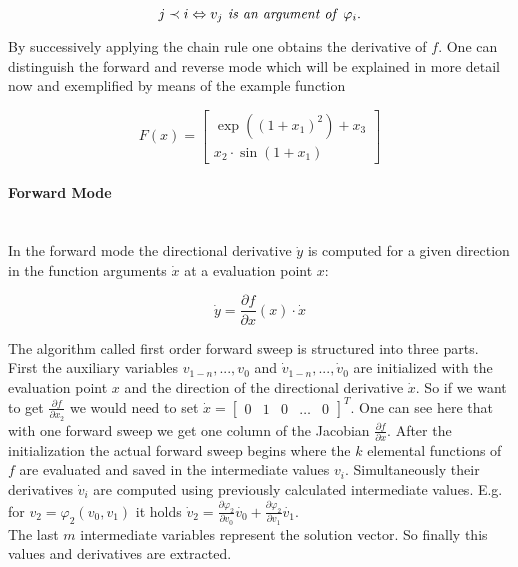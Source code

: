 \documentclass{scrartcl}[12pt, halfparskip]
\begin{document}
\begin{equation}
j \prec i \Leftrightarrow v_j \text{\textit{ is an argument of }} \varphi_i.
\end{equation}

By successively applying the chain rule one obtains the derivative of $f$.
One can distinguish the forward and reverse mode which will be explained in more detail now and exemplified by means of the example function

\begin{equation}
F(x) = 
\begin{bmatrix}
\exp((1+x_1)^2) + x_3 \\
x_2 \cdot \sin(1+x_1)
\end{bmatrix}
\end{equation}


\paragraph{Forward Mode}\mbox{}\\
In the forward mode the directional derivative $\dot{y}$ is computed for a given direction in the function arguments $\dot{x}$ at a evaluation point $x$:

\begin{equation}
\dot{y} = \frac{\partial f}{\partial x}(x) \cdot \dot{x}
\label{eq:AD_example}
\end{equation}

The algorithm called first order forward sweep is structured into three parts. First the auxiliary variables $v_{1-n},...,v_0$ and $\dot{v}_{1-n},...,\dot{v}_0$ are initialized with the evaluation point $x$ and the direction of the directional derivative $\dot{x}$. So if we want to get $\frac{\partial f}{\partial x_2}$ we would need to set $\dot{x} = \begin{bmatrix}
0 & 1 & 0 & \dots & 0
\end{bmatrix}^T$. One can see here that with one forward sweep we get one column of the Jacobian $ \frac{\partial f}{\partial x}$. 
After the initialization the actual forward sweep begins where the $k$ elemental functions of $f$ are evaluated and saved in the intermediate values $v_i$. Simultaneously their derivatives  $\dot{v}_i$ are computed using previously calculated intermediate values. E.g. for $v_2 = \varphi_2(v_0, v_1)$ it holds $\dot{v}_2 = \frac{\partial \varphi_2}{\partial v_0} \dot{v_0} + \frac{\partial \varphi_2}{\partial v_1} \dot{v_1}$. \\
The last $m$ intermediate variables represent the solution vector. So finally this values and derivatives are extracted.
\end{document}
